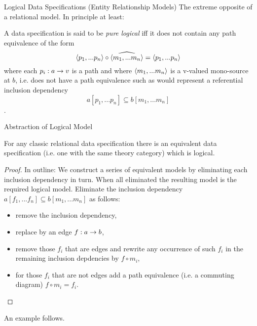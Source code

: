 \begin{frame}{Logical Data Specifications (Entity Relationship Models)}
The extreme opposite of a relational model. In principle at least:
\begin{definition}
A data specification is said to be \textit{pure logical} iff 
it does not contain any path equivalence of the form
$$\langle p_1,...p_n\rangle \circ \widehat{\langle m_1,...m_n\rangle}=\langle p_1,...p_n\rangle$$
where  each $p_i: a \rightarrow v$  is a path and 
where $\langle m_1,...m_n\rangle$ is a  v-valued mono-source at $b$,
 i.e. does not have a path equivalence such 
 as would represent a referential inclusion dependency
$$a[p_1,...p_n] \subseteq b[m_1,...m_n]$$.
\end{definition}
\end{frame}

\begin{frame}{Abstraction of Logical Model}
\begin{lemma}
For any classic relational data specification 
there is an equivalent data specification
(i.e. one with the same theory category) which is logical.
\end{lemma}

\begin{proof}
In outline: We construct a series of equivalent models by eliminating each 
inclusion dependency in turn. When all eliminated the resulting model is the required logical model. Eliminate the inclusion dependency 
$a[f_1,...f_n] \subseteq b[m_1,...m_n]$
as follows:
\begin{itemize}
\item remove the inclusion dependency,
\item replace by an edge $f: a \rightarrow b$, 
\item remove those $f_i$ that are edges and 
rewrite any occurrence of such $f_i$ in the remaining inclusion depdencies by $f \circ  m_i$, 
\item for those $f_i$ that are not edges add a path equivalence (i.e. a commuting diagram)
$f \circ m_i = f_i$.
\end{itemize}
\end{proof}
An example follows.
\end{frame}
